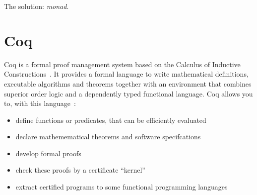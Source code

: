 The solution: \textit{monad}.

\section{Coq} 
Coq is a formal proof management system based on the Calculus of Inductive
Constructions~\cite{coqart}. It provides a formal language to write mathematical
definitions, executable algorithms and theorems together with an environment
that combines superior order logic and a dependently typed functional language.
Coq allows you to, with this language~\cite{coqsite}:
\begin{itemize}
\item define functions or predicates, that can be efficiently evaluated
\item declare mathemematical theorems and software specifcations
\item develop formal proofs
\item check these proofs by a certificate ``kernel''
\item extract certified programs to some functional programming languages
\end{itemize}


\iffalse
Coq é um provador de teoremas automatizado baseado na
linguagem formal Calculo de Construções Indutivas\cite{coqart}, o qual em si
mesmo combina tanto lógica de ordem superior quanto uma linguagem funtional
ricamente-tipada. Através de uma linguagem vernacular de comandos, Coq
permite: \begin{itemize} \item definir funções ou predicados, que podem ser
avaliados eficientemente; \item declarar teoremas matemáticos e
especificações de software; \item desenvolver provas formas destes teoremas
de forma iterativa; \item checar estas provas por uma certificação de
kernel relativamente pequena; \item extrair programas certificados para
Objective Caml, Haskell ou Scheme.  \end{itemize} Como um sistema de
desenvolvimento de provas, Coq provê métodos de provas iterativos,
algoritmos de decisão e semi-decisão, e uma linguagem de tatica que permite
o usuário definir seus próprios métodos de prova. Conexão com uma
calculadora de sistema algébrico externo e outros provadores de teoremas
está disponível.  Como uma plataforma de formalização matemática ou de
desenvolvimento de programas, coq provê suporte para notações de alta ordem,
conteúdos implicitos e vários outros tipos úteis de macros.
\fi











